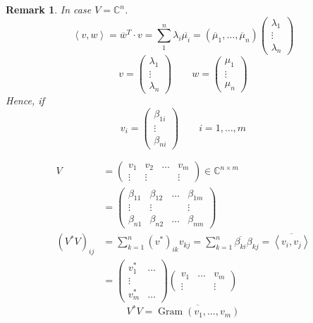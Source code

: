 \documentclass{article}
\newtheorem{remark}{Remark}  \numberwithin{remark}{section}
\newcommand{\ip}[2]{\left\langle#1,#2\right\rangle} %
\begin{document}
\begin{remark} %
  In case $V = \mathbb C^n$.
  \[ \ip vw = \overline{w}^T \cdot v = \sum_{1}^n \lambda_i \overline{\mu_i} = (\overline \mu_1, \ldots, \overline \mu_n)\begin{pmatrix} \lambda_1 \\ \vdots \\ \lambda_n \end{pmatrix} \]
  \[ v = \begin{pmatrix} \lambda_1 \\ \vdots \\ \lambda_n \end{pmatrix} \qquad w = \begin{pmatrix} \mu_1 \\ \vdots \\ \mu_n \end{pmatrix} \]
  Hence, if
  \[ v_i = \begin{pmatrix} \beta_{1i} \\ \vdots \\ \beta_{ni} \end{pmatrix} \qquad i = 1, \ldots, m \]

  \begin{align*}
    V &= \begin{pmatrix} v_1 & v_2 & \ldots & v_m \\ \vdots & \vdots & & \vdots \end{pmatrix} \in \mathbb C^{n \times m} \\
      &= \begin{pmatrix} \beta_{11} & \beta_{12} & \ldots & \beta_{1m} \\ \vdots & \vdots & & \vdots \\ \beta_{n1} & \beta_{n2} & \ldots & \beta_{nm} \end{pmatrix} \\
    (V^*V)_{ij} &= \sum_{k=1}^n (v^*)_{ik} v_{kj} = \sum_{k=1}^n \overline{\beta_{ki}} \beta_{kj} = \overline{\ip{v_i}{v_j}} \\
      &= \begin{pmatrix} v_1^* & \ldots \\ \vdots & \\ v_m^* & \ldots \end{pmatrix} \begin{pmatrix} v_1 & \ldots & v_m \\ \vdots &  & \vdots \end{pmatrix}
  \end{align*}
  \[ V^* V = \overline{\operatorname{Gram}(v_1, \ldots, v_m)} \]
\end{remark}
\end{document}
